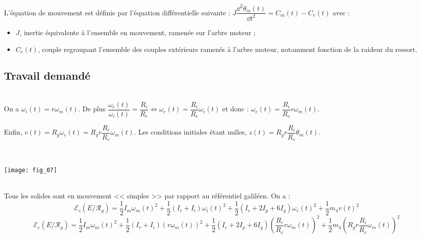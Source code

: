 \begin{multicols}{2}
L’équation de mouvement est définie par l’équation différentielle suivante : $J\dfrac{\dd^2 \theta_m(t)}{\dd t^2}=C_m(t)-C_e(t)$  avec :
\begin{itemize}
\item $J$, inertie équivalente à l’ensemble en mouvement, ramenée sur l’arbre moteur ;
\item $C_e(t)$, couple regroupant l’ensemble des couples extérieurs ramenés à l’arbre moteur, notamment fonction de la raideur du ressort.
\end{itemize}

\fi


\subsection*{Travail demandé}


\ifprof
\begin{corrige} ~\\
On a $\omega_i(t) = r\omega_m(t)$. De plus $\dfrac{\omega_e(t)}{\omega_i(t)}=\dfrac{R_i}{R_e} \Longleftrightarrow \omega_e(t)=\dfrac{R_i}{R_e}\omega_i(t)$ et donc :
$\omega_e(t)=\dfrac{R_i}{R_e}r\omega_m(t)$.

Enfin, $v(t)=R_g \omega_e(t) =R_g r \dfrac{R_i}{R_e}\omega_m(t)$. Les conditions initiales étant nulles, $z(t)=R_g r \dfrac{R_i}{R_e}\theta_m(t)$. 
\end{corrige}
\else
\fi


\ifprof
\begin{corrige} ~\\
\begin{center}
\texttt{[image: fig\_07]}
\end{center}

\end{corrige}
\else
\fi

\ifprof
\begin{corrige} ~\\

Tous les solides sont en mouvement << simples >> par rapport au référentiel galiléen. 
On a : 
$$
\mathcal{E}_c\left(E/\mathcal{R}_g\right) =
\dfrac{1}{2}I_m\omega_m(t)^2
+\dfrac{1}{2}\left(I_r+I_i\right)\omega_i(t)^2
+\dfrac{1}{2}\left(I_e+2I_p+6I_g\right)\omega_e(t)^2
+\dfrac{1}{2}m_4v(t)^2
$$
$$
\mathcal{E}_c\left(E/\mathcal{R}_g\right) =
\dfrac{1}{2}I_m\omega_m(t)^2
+\dfrac{1}{2}\left(I_r+I_i\right)\left( r\omega_m(t)\right)^2
+\dfrac{1}{2}\left(I_e+2I_p+6I_g\right)\left( \dfrac{R_i}{R_e}r\omega_m(t)\right)^2
+\dfrac{1}{2}m_4\left( R_g r \dfrac{R_i}{R_e}\omega_m(t) \right)^2
$$


\end{corrige}
\end{multicols}
